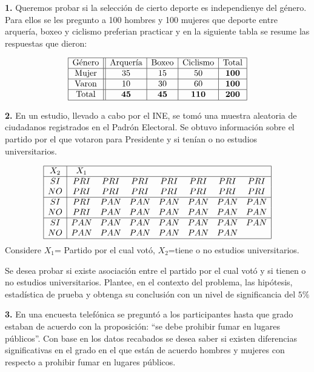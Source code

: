 \documentclass[
  a4paper,
  oneside,
  openany]{book}
\begin{document}
\textbf{1.} Queremos probar si la selección de cierto deporte es independienye del género. Para ellos se les pregunto a 100 hombres y 100 mujeres que deporte entre arquería, boxeo y ciclismo preferian practicar y en la siguiente tabla se resume las respuestas que dieron:

\[
\begin{array}{|c ||c |c |c|c|}
\hline 
\mbox{Género} & \mbox{Arquería}&\mbox{Boxeo} &\mbox{Ciclismo}& \mbox{Total} \\
\hline 
\mbox{Mujer} & 35 &  15 & 50&\textbf{100}\\
 \hline 
\mbox{Varon}& 10 & 30 &60&\textbf{100}\\ 
\hline 
\mbox{Total}&\textbf{45}&\textbf{45}&\textbf{110}&\textbf{200}\\
\hline 
\end{array}
\]

\textbf{2.} En un estudio, llevado a cabo por el INE, se tomó una muestra aleatoria de ciudadanos registrados en el Padrón Electoral. Se obtuvo información sobre el partido por el que votaron para Presidente y si tenían o no estudios universitarios.

\[
\begin{array}{|c|c c c c c c c|}
\hline
X_{2}&X_{1}&&&&&&\\
 \hline
SI & PRI & PRI & PRI & PRI & PRI & PRI & PRI\\
NO & PRI & PRI & PRI & PRI & PRI & PRI & PRI\\
 \hline
SI & PRI & PAN & PAN & PAN & PAN & PAN &PAN\\
NO & PRI & PAN & PAN & PAN & PAN & PAN & PAN\\
 \hline
SI & PAN & PAN & PAN & PAN & PAN & PAN & PAN\\
NO & PAN & PAN & PAN & PAN & PAN & PAN&\\
 \hline
\end{array}
\]
Considere \(X_{1}\)= Partido por el cual votó, \(X_{2}\)=tiene o no estudios universitarios.

Se desea probar si existe asociación entre el partido por el cual votó y si tienen o no estudios universitarios. Plantee, en el contexto del problema, las hipótesis, estadística de prueba y obtenga su conclusión con un nivel de significancia del \(5\%\)

\textbf{3.} En una encuesta telefónica se preguntó a los participantes hasta que grado estaban de acuerdo
con la proposición: ``se debe prohibir fumar en lugares públicos''. Con base en los datos recabados se desea saber si existen diferencias significativas en el grado en el que están de acuerdo hombres y mujeres con respecto a prohibir fumar en lugares públicos.
\end{document}
